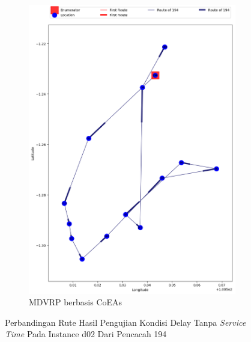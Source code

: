 \begin{figure}[H]
	\centering
	\begin{subfigure}[t]{\textwidth}
		\centering
		\includegraphics[width=\textwidth]{Resources/Images/delayed_2/real_m15_n100_delayed_2_194_coes}
		\caption{MDVRP berbasis CoEAs}
		\label{fig:real_m15_n100_delayed_2_194_coes}
	\end{subfigure}
	\caption{Perbandingan Rute Hasil Pengujian Kondisi Delay Tanpa \textit{Service Time} Pada Instance d02 Dari Pencacah 194}
	\label{fig:real_m15_n100_delayed_2_194}
\end{figure}


